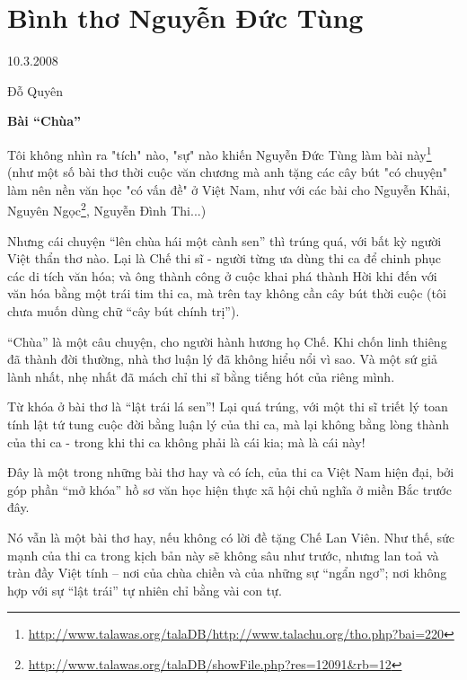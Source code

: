\documentclass[../main.tex]{subfiles}
\begin{document}
\chapter{Bình thơ Nguyễn Đức Tùng}

\begin{metadata}

\begin{flushright}10.3.2008\end{flushright}

Đỗ Quyên



\end{metadata}

\begin{multicols}{2}

\textbf{Bài “Chùa”} 
 
Tôi không nhìn ra "tích" nào, "sự" nào khiến Nguyễn Đức Tùng làm bài này\footnote{\url{http://www.talawas.org/talaDB/http://www.talachu.org/tho.php?bai=220}} (như một số bài thơ thời cuộc văn chương mà anh tặng các cây bút "có chuyện" làm nên nền văn học "có vấn đề" ở Việt Nam, như với các bài cho Nguyễn Khải, Nguyên Ngọc\footnote{\url{http://www.talawas.org/talaDB/showFile.php?res=12091&rb=12}}, Nguyễn Đình Thi...)  
 
Nhưng cái chuyện “lên chùa hái một cành sen” thì trúng quá, với bất kỳ người Việt thẩn thơ nào. Lại là Chế thi sĩ - người từng ưa dùng thi ca để chinh phục các di tích văn hóa; và ông thành công ở cuộc khai phá thành Hời khi đến với văn hóa bằng một trái tim thi ca, mà trên tay không cần cây bút thời cuộc (tôi chưa muốn dùng chữ “cây bút chính trị”). 
 
“Chùa” là một câu chuyện, cho người hành hương họ Chế. Khi chốn linh thiêng đã thành đời thường, nhà thơ luận lý đã không hiểu nổi vì sao. Và một sứ giả lành nhất, nhẹ nhất đã mách chỉ thi sĩ bằng tiếng hót của riêng mình.  
 
Từ khóa ở bài thơ là “lật trái lá sen”! Lại quá trúng, với một thi sĩ triết lý toan tính lật tứ tung cuộc đời bằng luận lý của thi ca, mà lại không bằng lòng thành của thi ca - trong khi thi ca không phải là cái kia; mà là cái này! 
 
Đây là một trong những bài thơ hay và có ích, của thi ca Việt Nam hiện đại, bởi góp phần “mở khóa” hồ sơ văn học hiện thực xã hội chủ nghĩa ở miền Bắc trước đây. 
 
Nó vẫn là một bài thơ hay, nếu không có lời đề tặng Chế Lan Viên. Như thế, sức mạnh của thi ca trong kịch bản này sẽ không sâu như trước, nhưng lan toả và tràn đầy Việt tính – nơi của chùa chiền và của những sự “ngẩn ngơ”; nơi không hợp với sự “lật trái” tự nhiên chỉ bằng vài con tự. 
 

\end{multicols}
\end{document}
